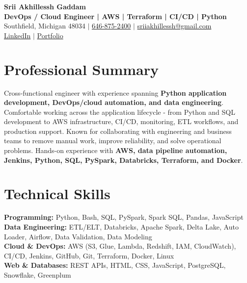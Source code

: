 \documentclass[letterpaper,10pt]{article}
\begin{document}
\fontsize{9.35pt}{10.45pt}\selectfont

\begin{center}
    {\LARGE \textbf{Srii Akhillessh Gaddam}} \\[-1pt]
    \textbf{DevOps / Cloud Engineer | AWS | Terraform | CI/CD | Python} \\[2pt]
    Southfield, Michigan 48034 $|$
    \href{tel:6468752400}{646-875-2400} $|$
    \href{mailto:sriiakhillessh@gmail.com}{sriiakhillessh@gmail.com} \\[1pt]
    \href{https://www.linkedin.com/in/srii-akhiilessh-gaddam-b48668191/}{LinkedIn} $|$
    \href{https://sriiakhillesshg.github.io/portfolio/}{Portfolio}
\end{center}
\vspace{-8pt}

\section{Professional Summary}
\small{Cross-functional engineer with experience spanning \textbf{Python application development, DevOps/cloud automation, and data engineering}. Comfortable working across the application lifecycle - from Python and SQL development to AWS infrastructure, CI/CD, monitoring, ETL workflows, and production support. Known for collaborating with engineering and business teams to remove manual work, improve reliability, and solve operational problems. Hands-on experience with \textbf{AWS, data pipeline automation, Jenkins, Python, SQL, PySpark, Databricks, Terraform, and Docker}.}

\section{Technical Skills}
\small{
\textbf{Programming:} Python, Bash, SQL, PySpark, Spark SQL, Pandas, JavaScript \\
\textbf{Data Engineering:} ETL/ELT, Databricks, Apache Spark, Delta Lake, Auto Loader, Airflow, Data Validation, Data Modeling \\
\textbf{Cloud \& DevOps:} AWS (S3, Glue, Lambda, Redshift, IAM, CloudWatch), CI/CD, Jenkins, GitHub, Git, Terraform, Docker, Linux \\
\textbf{Web \& Databases:} REST APIs, HTML, CSS, JavaScript, PostgreSQL, Snowflake, Greenplum
}
\end{document}
